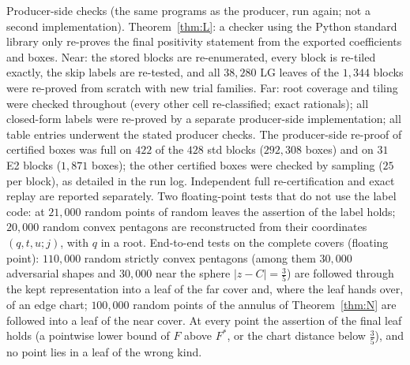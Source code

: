 \documentclass[11pt]{article}
\theoremstyle{remark}
\begin{document}
Producer-side checks (the same programs as the producer, run again; not a second implementation).
Theorem~\ref{thm:L}: a checker using the Python standard library only re-proves the final positivity statement from the
exported coefficients and boxes. Near: the stored blocks are re-enumerated, every block is re-tiled exactly, the skip
labels are re-tested, and all $38{,}280$ LG leaves of the $1{,}344$ blocks were re-proved from scratch with new trial
families. Far: root coverage and tiling were checked throughout (every other cell re-classified; exact rationals);
all closed-form labels were re-proved by a separate producer-side implementation; all table entries underwent the
stated producer checks. The producer-side re-proof of certified boxes was full on $422$ of the $428$ std blocks
($292{,}308$ boxes) and on $31$ E2 blocks ($1{,}871$ boxes); the other certified boxes were checked by sampling ($25$ per
block), as detailed in the run log. Independent full re-certification and exact replay are reported separately. Two floating-point tests that do
not use the label code: at $21{,}000$ random points of random leaves the assertion of the label holds; $20{,}000$ random
convex pentagons are reconstructed from their coordinates $(q,t,u;j)$, with $q$ in a root. End-to-end tests on the
complete covers (floating point): $110{,}000$ random strictly convex pentagons (among them $30{,}000$ adversarial shapes and
$30{,}000$ near the sphere $|z-C|=\frac35$) are followed through the kept representation into a leaf of the far cover
and, where the leaf hands over, of an edge chart; $100{,}000$ random points of the annulus of Theorem~\ref{thm:N} are
followed into a leaf of the near cover. At every point the assertion of the final leaf holds (a pointwise lower bound
of $F$ above $F^*$, or the chart distance below $\frac35$), and no point lies in a leaf of the wrong kind.
\end{document}
